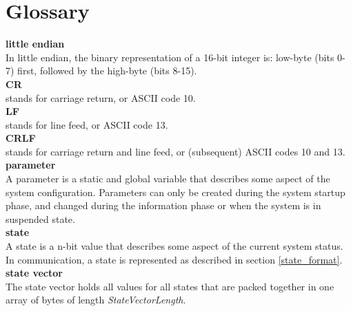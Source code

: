 \documentclass[letterpaper,oneside,12pt]{book}
\begin{document}
\section{Glossary} 

\textbf{little endian} \\
In little endian, the binary representation of a 16-bit integer is: low-byte (bits 0-7)
first, followed by the high-byte (bits 8-15).
\\[2ex]
\textbf{CR} \\
stands for carriage return, or {ASCII} code 10.
\\[2ex]
\textbf{LF} \\
stands for line feed, or {ASCII} code 13.
\\[2ex]
\textbf{CRLF} \\
stands for carriage return and line feed, or (subsequent) {ASCII} codes 10 and 13.
\\[2ex]
\textbf{parameter} \\
A parameter is a static and global variable that describes some aspect of the 
system configuration. Parameters can only be created during the system startup phase, and changed during the information phase or when the system is in suspended state.
\\[2ex]
\textbf{state} \\
A state is a n-bit value that describes some aspect of the current system 
status. In communication, a state is represented as described in section
\ref{state_format}.
\\[2ex]
\textbf{state vector} \\
The state vector holds all values for all states that are packed together in one
array of bytes of length \textit{StateVectorLength}.


\backmatter
\end{document}
